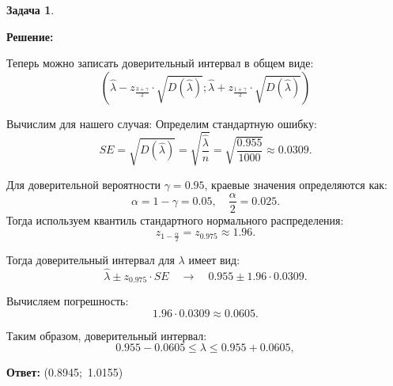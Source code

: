\documentclass[a4paper,11pt]{article}
\newenvironment{shdd}{\begin{mdframed}[backgroundcolor=shadecolor]}{\end{mdframed}}
\theoremstyle{definition}
\newtheorem{problem}{Задача}\setlength{\parindent}{0pt}
\newenvironment{solution}
{\begin{shdd}\textbf{Решение:}\par\setlength{\parindent}{0pt}}
{\end{shdd}}
\newenvironment{answer}
{\par\noindent\textbf{Ответ:}}
{\par}
\begin{document}
\begin{problem}
\begin{solution}
            Теперь можно записать доверительный интервал \lambda в общем виде: 
            \[
            (\hat{\lambda} - z_{\frac{3 + \gamma}{2}} \cdot \sqrt{D(\hat{\lambda})}; \hat{\lambda} + z_{\frac{1+\gamma}{2}} \cdot \sqrt{D(\hat{\lambda})})
            \]

            Вычислим для нашего случая: 
            Определим стандартную ошибку:
            \[
            SE = \sqrt{D(\hat{\lambda})} = \sqrt{\frac{\hat{\lambda}}{n}} = \sqrt{\frac{0.955}{1000}} \approx 0.0309.
            \]
            
            Для доверительной вероятности \(\gamma = 0.95\), краевые значения определяются как:
            \[
            \alpha = 1 - \gamma = 0.05,\quad \frac{\alpha}{2} = 0.025.
            \]
            Тогда используем квантиль стандартного нормального распределения:
            \[
            z_{1 - \frac{\alpha}{2}} = z_{0.975} \approx 1.96.
            \]
            
            Тогда доверительный интервал для \(\lambda\) имеет вид:
            \[
            \hat{\lambda} \pm z_{0.975} \cdot SE \quad \rightarrow \quad 0.955 \pm 1.96 \cdot 0.0309.
            \]
            
            Вычисляем погрешность:
            \[
            1.96 \cdot 0.0309 \approx 0.0605.
            \]
            
            Таким образом, доверительный интервал:
            \[
            0.955 - 0.0605 \leq \lambda \leq 0.955 + 0.0605,
            \]
            
    \end{solution}

    \begin{answer}
        (0.8945;\, 1.0155)
    \end{answer}

\end{problem}
\end{document}
